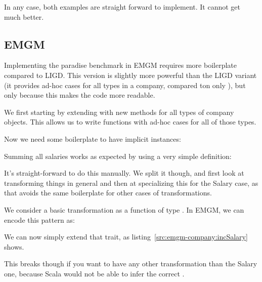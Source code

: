 In any case, both examples are straight forward to implement. It cannot get
much better.


\subsection{EMGM}

Implementing the paradise benchmark in EMGM requires more boilerplate compared
to LIGD. This version is slightly more powerful than the LIGD variant (it
provides ad-hoc cases for all types in a company, compared ton only ),
but only because this makes the code more readable.

We first starting by extending  with new methods for all types of
company objects. This allows us to write functions with ad-hoc cases for all
of those types.



Now we need some boilerplate to have implicit  instances:


\begin{example}
Summing all salaries works as expected by using a very simple definition:

\end{example}

\begin{example}
It's straight-forward to do this manually. We split it though, and first look
at transforming things in general and then at specializing this for the Salary
case, as that avoids the same boilerplate for other cases of transformations.

We consider a basic transformation as a function of type . In EMGM,
we can encode this pattern as:


We can now simply extend that trait, as listing~\ref{src:emgm-company:incSalary} shows.


This breaks though if you want to have any other transformation than the Salary
one, because Scala would not be able to infer the correct .
\end{example}

